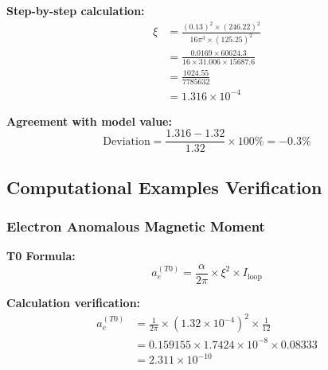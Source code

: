 \documentclass[12pt,a4paper]{article}
\begin{document}
	\textbf{Step-by-step calculation:}
	\begin{align}
		\xi &= \frac{(0.13)^2 \times (246.22)^2}{16\pi^3 \times (125.25)^2} \nonumber \\
		&= \frac{0.0169 \times 60624.3}{16 \times 31.006 \times 15687.6} \nonumber \\
		&= \frac{1024.55}{7785632} \nonumber \\
		&= 1.316 \times 10^{-4}
		\label{eq:xi_calculation_detailed}
	\end{align}
	
	\textbf{Agreement with model value:}
	\begin{equation}
		\text{Deviation} = \frac{1.316 - 1.32}{1.32} \times 100\% = -0.3\%
		\label{eq:xi_deviation}
	\end{equation}
	
	\subsection{Computational Examples Verification}
	\label{subsec:examples_verification}
	
	\subsubsection{Electron Anomalous Magnetic Moment}
	
	\textbf{T0 Formula:}
	\begin{equation}
		a_e^{(T0)} = \frac{\alpha}{2\pi} \times \xi^2 \times I_{\text{loop}}
		\label{eq:electron_g2_verification}
	\end{equation}
	
	\textbf{Calculation verification:}
	\begin{align}
		a_e^{(T0)} &= \frac{1}{2\pi} \times (1.32 \times 10^{-4})^2 \times \frac{1}{12} \nonumber \\
		&= 0.159155 \times 1.7424 \times 10^{-8} \times 0.08333 \nonumber \\
		&= 2.311 \times 10^{-10}
		\label{eq:electron_g2_calc_verification}
	\end{align}
	
\end{document}
